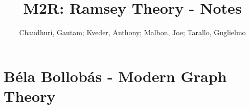 \documentclass{article}
\title{M2R: Ramsey Theory - Notes}
\author{Chaudhuri, Gautam; Kveder, Anthony; Malbon, Joe; Tarallo, Guglielmo}
\begin{document}
\maketitle
\tableofcontents

\section{Béla Bollobás - Modern Graph Theory}

\end{document}
